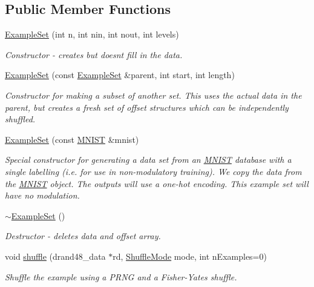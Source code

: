 \subsection*{Public Member Functions}
\begin{DoxyCompactItemize}
\item 
\hyperlink{classExampleSet_abc839769d9337279f1627d4822c65a44}{Example\+Set} (int n, int nin, int nout, int levels)
\begin{DoxyCompactList}\small\item\em Constructor -\/ creates but doesn\textquotesingle{}t fill in the data. \end{DoxyCompactList}\item 
\hyperlink{classExampleSet_a1e7d58c8262da06bf8d0de1a20a3b994}{Example\+Set} (const \hyperlink{classExampleSet}{Example\+Set} \&parent, int start, int length)
\begin{DoxyCompactList}\small\item\em Constructor for making a subset of another set. This uses the actual data in the parent, but creates a fresh set of offset structures which can be independently shuffled. \end{DoxyCompactList}\item 
\hyperlink{classExampleSet_a5abacfde6b834ad368ccb28eb7900205}{Example\+Set} (const \hyperlink{classMNIST}{M\+N\+I\+ST} \&mnist)
\begin{DoxyCompactList}\small\item\em Special constructor for generating a data set from an \hyperlink{classMNIST}{M\+N\+I\+ST} database with a single labelling (i.\+e. for use in non-\/modulatory training). We copy the data from the \hyperlink{classMNIST}{M\+N\+I\+ST} object. The outputs will use a one-\/hot encoding. This example set will have no modulation. \end{DoxyCompactList}\item 
\hyperlink{classExampleSet_a442c40fd6b16d0f41b613b106e55dec7}{$\sim$\+Example\+Set} ()
\begin{DoxyCompactList}\small\item\em Destructor -\/ deletes data and offset array. \end{DoxyCompactList}\item 
void \hyperlink{classExampleSet_a2df897c759c7cc03475f68fd1f4834b9}{shuffle} (drand48\+\_\+data $\ast$rd, \hyperlink{classExampleSet_afcdcdbc9a02c53864997e334d8bae33d}{Shuffle\+Mode} mode, int n\+Examples=0)
\begin{DoxyCompactList}\small\item\em Shuffle the example using a P\+R\+NG and a Fisher-\/\+Yates shuffle. \end{DoxyCompactList}\item 

\end{DoxyCompactItemize}
